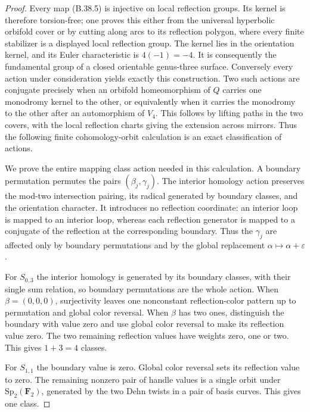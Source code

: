 \begin{proof}
Every map (B.38.5) is injective on local reflection groups.
Its kernel is therefore torsion-free; one proves this either
from the universal hyperbolic orbifold cover or by cutting along
arcs to its reflection polygon, where every finite stabilizer
is a displayed local reflection group.
The kernel lies in the orientation kernel, and its Euler
characteristic is $4(-1)=-4$.  It is consequently the fundamental
group of a closed orientable genus-three surface.
Conversely every action under consideration yields exactly
this construction.  Two such actions are conjugate precisely
when an orbifold homeomorphism of $Q$ carries one monodromy
kernel to the other, or equivalently when it carries the
monodromy to the other after an automorphism of $V_4$.
This follows by lifting paths in the two covers, with the
local reflection charts giving the extension across mirrors.
Thus the following finite cohomology-orbit calculation is an
exact classification of actions.

We prove the entire mapping class action needed in this
calculation.  A boundary permutation permutes the pairs
$(\beta_j,\gamma_j)$.  The interior homology action preserves
the mod-two intersection pairing, its radical generated by
boundary classes, and the orientation character.
It introduces no reflection coordinate: an interior loop
is mapped to an interior loop, whereas each reflection generator
is mapped to a conjugate of the reflection at the corresponding
boundary.  Thus the $\gamma_j$ are affected only by boundary
permutations and by the global replacement
$\alpha\mapsto\alpha+\varepsilon$.

For $S_{0,3}$ the interior homology is generated by its boundary
classes, with their single sum relation, so boundary permutations
are the whole action.  When $\beta=(0,0,0)$, surjectivity leaves
one nonconstant reflection-color pattern up to permutation and
global color reversal.  When $\beta$ has two ones, distinguish
the boundary with value zero and use global color reversal to
make its reflection value zero.  The two remaining reflection
values have weights zero, one or two.  This gives $1+3=4$ classes.

For $S_{1,1}$ the boundary value is zero.
Global color reversal sets its reflection value to zero.
The remaining nonzero pair of handle values is a single orbit
under $\mathrm{Sp}_2(\mathbf F_2)$, generated by the two Dehn
twists in a pair of basis curves.  This gives one class.


\end{proof}

